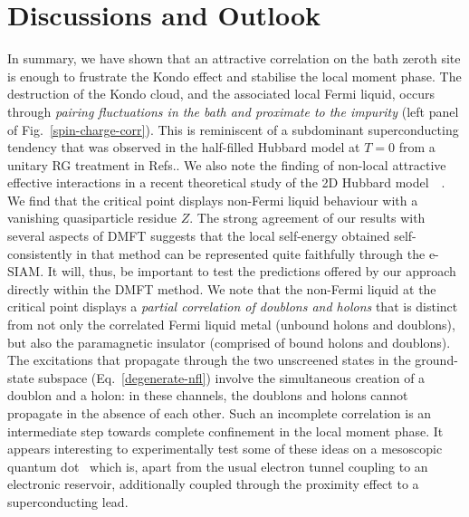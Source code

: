 \documentclass{iopart}
\begin{document}
\section{Discussions and Outlook}
\label{concl}
In summary, we have shown that an attractive correlation on the bath zeroth site is enough to frustrate the Kondo effect and stabilise the local moment phase. 
The destruction of the Kondo cloud, and the associated local Fermi liquid, occurs through {\it pairing fluctuations in the bath and proximate to the impurity} (left panel of Fig.~\eqref{spin-charge-corr}).
This is reminiscent of a subdominant superconducting tendency that was observed in the half-filled Hubbard model at $T=0$ from a unitary RG treatment in Refs.\cite{anirbanmott1,Mukherjee_mott_merg}. We also note the finding of non-local attractive effective interactions in a recent theoretical study of the 2D Hubbard model~\cite{gazizovaleblanc2023}~. 
We find that the critical point displays non-Fermi liquid behaviour with a vanishing quasiparticle residue \(Z\). 
The strong agreement of our results with several aspects of DMFT suggests that the local self-energy obtained self-consistently in that method can be represented quite faithfully through the e-SIAM. It will, thus, be important to test the predictions offered by our approach directly within the DMFT method. We note that the non-Fermi liquid at the critical point displays a {\it partial correlation of doublons and holons} that is distinct from not only the correlated Fermi liquid metal (unbound holons and doublons), but also the paramagnetic insulator (comprised of bound holons and doublons). The excitations that propagate through the two unscreened states in the ground-state subspace (Eq.~\eqref{degenerate-nfl}) involve the simultaneous creation of a doublon and a holon: in these channels, the doublons and holons cannot propagate in the absence of each other. Such an incomplete correlation is an intermediate step towards complete confinement in the local moment phase. It appears interesting to experimentally test some of these ideas on a mesoscopic quantum dot~\cite{Iftikhar2015,Iftikhar2018} which is, apart from the usual electron tunnel coupling to an electronic reservoir, additionally coupled through the proximity effect to a superconducting lead.
\end{document}
